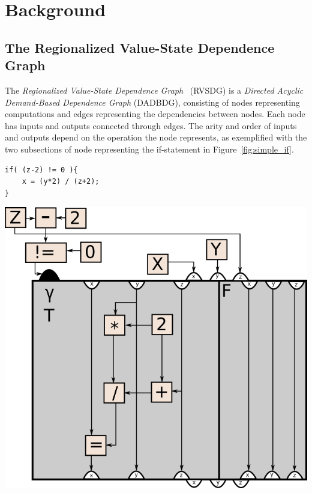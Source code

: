 
\clearpage
\section{Background}
\label{background}

\subsection{The Regionalized Value-State Dependence Graph}
\label{background:RVSDG}

The \textit{Regionalized Value-State Dependence Graph}~\cite{RVSDG:HiPEACpaper}
(RVSDG) is a \textit{Directed Acyclic Demand-Based Dependence Graph} (DADBDG),
consisting of nodes representing computations and edges representing the
dependencies between nodes. Each node has inputs and outputs connected through
edges. The arity and order of inputs and outputs depend on the operation the
node represents, as exemplified with the two subsections of node representing
the if-statement in Figure~\ref{fig:simple_if}.

\begin{centering}
	\noindent\begin{minipage}{0.36\textwidth}
		\begin{lstlisting}[label={lst:simple_if}, style=minipage_customcpp]
if( (z-2) != 0 ){
	x = (y*2) / (z+2);
}
		\end{lstlisting}
	\end{minipage}
	\noindent\begin{minipage}{0.55\textwidth}
		\captionsetup{type=figure}
		\includegraphics[width=\textwidth]{figures/simple_if_example}
	\end{minipage}
	\label{fig:simple_if}
\end{centering}

